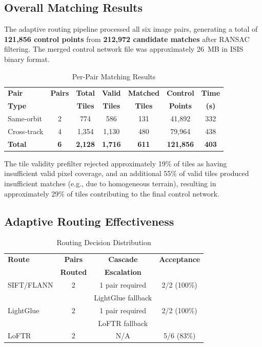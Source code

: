 \documentclass[lettersize,journal]{IEEEtran}
\begin{document}
\subsection{Overall Matching Results}

The adaptive routing pipeline processed all six image pairs, generating a total of \textbf{121,856 control points} from \textbf{212,972 candidate matches} after RANSAC filtering. The merged control network file was approximately 26~MB in ISIS binary format.

\begin{table}[htbp]
\caption{Per-Pair Matching Results}
\label{tab:results}
\centering
\begin{tabular}{@{}lcccccc@{}}
\toprule
\textbf{Pair} & \textbf{Pairs} & \textbf{Total} & \textbf{Valid} & \textbf{Matched} & \textbf{Control} & \textbf{Time} \\
\textbf{Type} &  & \textbf{Tiles} & \textbf{Tiles} & \textbf{Tiles} & \textbf{Points} & \textbf{(s)} \\
\midrule
Same-orbit & 2 & 774 & 586 & 131 & 41,892 & 332 \\
Cross-track & 4 & 1,354 & 1,130 & 480 & 79,964 & 438 \\
\textbf{Total} & \textbf{6} & \textbf{2,128} & \textbf{1,716} & \textbf{611} & \textbf{121,856} & \textbf{403} \\
\bottomrule
\end{tabular}
\end{table}

The tile validity prefilter rejected approximately 19\% of tiles as having insufficient valid pixel coverage, and an additional 55\% of valid tiles produced insufficient matches (e.g., due to homogeneous terrain), resulting in approximately 29\% of tiles contributing to the final control network.

\subsection{Adaptive Routing Effectiveness}

\begin{table}[htbp]
\caption{Routing Decision Distribution}
\label{tab:routing_dist}
\centering
\begin{tabular}{@{}lccc@{}}
\toprule
\textbf{Route} & \textbf{Pairs} & \textbf{Cascade} & \textbf{Acceptance} \\
 & \textbf{Routed} & \textbf{Escalation} &  \\
\midrule
SIFT/FLANN & 2 & 1 pair required & 2/2 (100\%) \\
 &  & LightGlue fallback &  \\
LightGlue & 2 & 1 pair required & 2/2 (100\%) \\
 &  & LoFTR fallback &  \\
LoFTR & 2 & N/A & 5/6 (83\%) \\
\bottomrule
\end{tabular}
\end{table}
\end{document}
